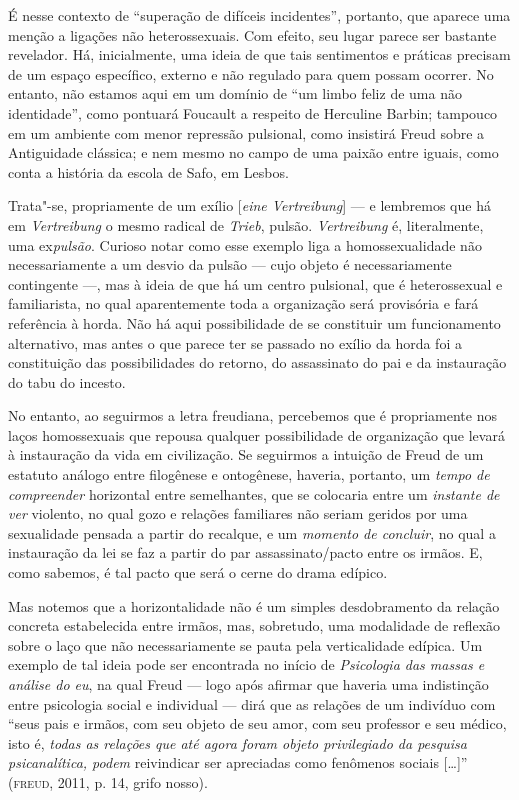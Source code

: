 É nesse contexto de ``superação de difíceis incidentes'', portanto, que
aparece uma menção a ligações não heterossexuais. Com efeito, seu lugar
parece ser bastante revelador. Há, inicialmente, uma ideia de que tais
sentimentos e práticas precisam de um espaço específico, externo e não
regulado para quem possam ocorrer. No entanto, não estamos aqui em um
domínio de ``um limbo feliz de uma não identidade'', como pontuará
Foucault a respeito de Herculine Barbin; tampouco em um ambiente com
menor repressão pulsional, como insistirá Freud sobre a Antiguidade
clássica; e nem mesmo no campo de uma paixão entre iguais, como conta a
história da escola de Safo, em Lesbos.

Trata"-se, propriamente de um exílio {[}\emph{eine Vertreibung}{]} --- e
lembremos que há em \emph{Vertreibung} o mesmo radical de \emph{Trieb},
pulsão. \emph{Vertreibung} é, literalmente, uma ex\emph{pulsão}.
Curioso notar como esse exemplo liga a homossexualidade não
necessariamente a um desvio da pulsão --- cujo objeto é necessariamente
contingente ---, mas à ideia de que há um centro pulsional, que é
heterossexual e familiarista, no qual aparentemente toda a organização
será provisória e fará referência à horda. Não há aqui possibilidade de
se constituir um funcionamento alternativo, mas antes o que parece ter
se passado no exílio da horda foi a constituição das possibilidades do
retorno, do assassinato do pai e da instauração do tabu do incesto.

No entanto, ao seguirmos a letra freudiana, percebemos que é
propriamente nos laços homossexuais que repousa qualquer possibilidade
de organização que levará à instauração da vida em civilização. Se
seguirmos a intuição de Freud de um estatuto análogo entre filogênese e
ontogênese, haveria, portanto, um \emph{tempo de compreender} horizontal
entre semelhantes, que se colocaria entre um \emph{instante de ver}
violento, no qual gozo e relações familiares não seriam geridos por uma
sexualidade pensada a partir do recalque, e um \emph{momento de
concluir}, no qual a instauração da lei se faz a partir do par
assassinato/pacto entre os irmãos. E, como sabemos, é tal pacto que será
o cerne do drama edípico.

Mas notemos que a horizontalidade não é um simples desdobramento da
relação concreta estabelecida entre irmãos, mas, sobretudo, uma
modalidade de reflexão sobre o laço que não necessariamente se pauta
pela verticalidade edípica. Um exemplo de tal ideia pode ser encontrada
no início de \emph{Psicologia das massas e análise do eu}, na qual Freud
--- logo após afirmar que haveria uma indistinção entre psicologia
social e individual --- dirá que as relações de um indivíduo com ``seus
pais e irmãos, com seu objeto de seu amor, com seu professor e seu
médico, isto é, \emph{todas as relações que até agora foram objeto
privilegiado da pesquisa psicanalítica, podem} reivindicar ser
apreciadas como fenômenos sociais {[}\ldots{}{]}'' (\textsc{freud}, 2011, p. 14,
grifo nosso).


